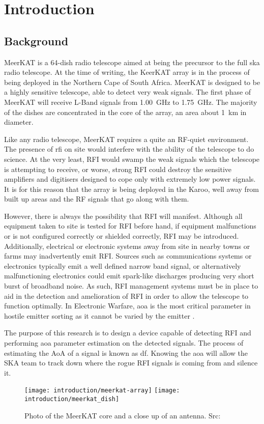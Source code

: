 \chapter{Introduction}
\label{ch:introduction}
\section{Background}
MeerKAT is a 64-dish radio telescope aimed at being the precursor to the full \gls{ska} radio telescope. At the time of writing, the KeerKAT array is in the process of being deployed in the Northern Cape of South Africa.
MeerKAT is designed to be a highly sensitive telescope, able to detect very weak signals. The first phase of MeerKAT will receive L-Band signals from \SI{1.00}{\giga\hertz} to \SI{1.75}{\giga\hertz}. The majority of the dishes are concentrated in the core of the array, an area about \SI{1}{\kilo\meter} in diameter.

Like any radio telescope, MeerKAT requires a quite an RF-quiet environment.
The presence of \gls{rfi} on site would interfere with the ability of the telescope to do science. At the very least, RFI would swamp the weak signals which the telescope is attempting to receive, or  worse, strong RFI could destroy the sensitive amplifiers and digitisers designed to cope only with extremely low power signals.
It is for this reason that the array is being deployed in the Karoo, well away from built up areas and the RF signals that go along with them.

However, there is always the possibility that RFI will manifest. 
Although all equipment taken to site is tested for RFI before hand, if equipment malfunctions or is not configured correctly or shielded correctly, RFI may be introduced. Additionally, electrical or electronic systems away from site in nearby towns or farms may inadvertently emit RFI. 
Sources such as communications systems or electronics typically emit a well defined narrow band signal, or alternatively malfunctioning electronics could emit spark-like discharges producing very short burst of broadband noise.
As such, RFI management systems must be in place to aid in the detection and amelioration of RFI in order to allow the telescope to function optimally. In Electronic Warfare, \gls{aoa} is the most critical parameter in hostile emitter sorting as it cannot be varied by the emitter \cite{center2012electronic}.

The purpose of this research is to design a device capable of detecting RFI and performing \gls{aoa} parameter estimation on the detected signals.
The process of estimating the AoA of a signal is known as \gls{df}.
Knowing the \gls{aoa} will allow the SKA team to track down where the rogue RFI signals is coming from and silence it.

\begin{figure}[hb]
  \centering
  \texttt{[image: introduction/meerkat-array]}
  \texttt{[image: introduction/meerkat\_dish]}
  \caption{Photo of the MeerKAT core and a close up of an antenna. Src: \cite{skasawebsite}}
\end{figure}




